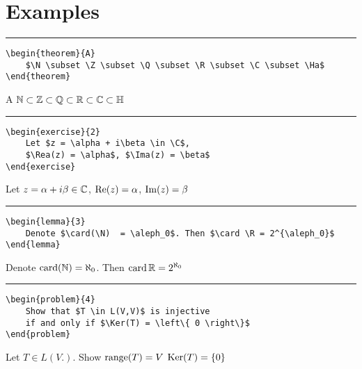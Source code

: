 \documentclass[12pt]{article}
\begin{document}
\section*{Examples}

\noindent\rule{\textwidth}{1pt}

\begin{verbatim}
\begin{theorem}{A}
    $\N \subset \Z \subset \Q \subset \R \subset \C \subset \Ha$
\end{theorem}
\end{verbatim}

\begin{theorem}{A}
$\mathbb{N} \subset \mathbb{Z} \subset \mathbb{Q} \subset \mathbb{R} \subset \mathbb{C} \subset \mathbb{H}$
\end{theorem}

\noindent\rule{\textwidth}{1pt}

\begin{verbatim}
\begin{exercise}{2}
    Let $z = \alpha + i\beta \in \C$,
    $\Rea(z) = \alpha$, $\Ima(z) = \beta$
\end{exercise}
\end{verbatim}

\begin{exercise}{2}
    Let $z = \alpha + i\beta \in \mathbb{C}$,
     $\operatorname{Re}(z) = \alpha$, $\operatorname{Im}(z) = \beta$
\end{exercise}

\noindent\rule{\textwidth}{1pt}


\begin{verbatim}
\begin{lemma}{3}
    Denote $\card(\N)  = \aleph_0$. Then $\card \R = 2^{\aleph_0}$
\end{lemma}
\end{verbatim}

\begin{lemma}{3}
    Denote $\operatorname{card}(\mathbb{N})  = \aleph_0$. Then $\operatorname{card} \mathbb{R} = 2^{\aleph_0}$
\end{lemma}

\noindent\rule{\textwidth}{1pt}

\begin{verbatim}
\begin{problem}{4}
    Show that $T \in L(V,V)$ is injective 
    if and only if $\Ker(T) = \left\{ 0 \right\}$
\end{problem}
\end{verbatim}

\begin{problem}{4}
    Let $T \in L(V.)$. Show $\operatorname{range}(T) = V$  $\operatorname{Ker}(T) = \left\{ 0 \right\}$
\end{problem}
\end{document}
